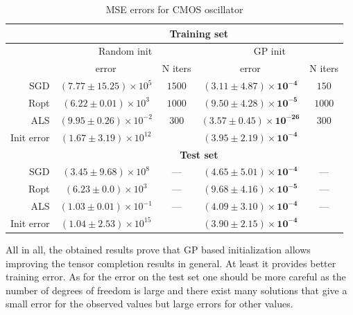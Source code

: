 \begin{table}[]
    \centering
    \caption{MSE errors for CMOS oscillator}
    \label{tab:results_cmos}
    \begin{tabular}{r|cc|cc|}
         & \multicolumn{4}{c|}{\textbf{Training set}} \\
        \hline
        & \multicolumn{2}{c|}{Random init} & \multicolumn{2}{c|}{GP init} \\
        & error & N iters & error & N iters \\
        \hline
        SGD & $(7.77 \pm 15.25) \times 10^5$ & $1500$ &
        $\mathbf{(3.11 \pm 4.87) \times 10^{-4}}$ & $150$ \\

        Ropt & $(6.22 \pm 0.01) \times 10^3$ & $1000$ &
        $\mathbf{(9.50 \pm 4.28) \times 10^{-5}}$ & $1000$ \\

        ALS & $(9.95 \pm 0.26) \times 10^{-2}$ & $300$ &
        $\mathbf{(3.57 \pm 0.45) \times 10^{-26}}$ & $300$ \\
        \hline
        Init error & $(1.67 \pm 3.19) \times 10^{12}$ & &
        $\mathbf{(3.95 \pm 2.19) \times 10^{-4}}$ & \\
        \hline

         & \multicolumn{4}{c|}{\textbf{Test set}} \\
        \hline

        SGD & $(3.45 \pm 9.68) \times 10^8$ & --- &
        $\mathbf{(4.65 \pm 5.01) \times 10^{-4}}$ & --- \\

        Ropt & $(6.23 \pm 0.0) \times 10^3$ & --- &
        $\mathbf{(9.68 \pm 4.16) \times 10^{-5}}$ & --- \\

        ALS & $(1.03 \pm 0.01) \times 10^{-1}$ & --- &
        $\mathbf{(4.09 \pm 3.10) \times 10^{-4}}$ & --- \\
        \hline
        Init error & $(1.04 \pm 2.53) \times 10^{15}$ & &
        $\mathbf{(3.90 \pm 2.15) \times 10^{-4}}$ & \\
        \hline
    \end{tabular}
\end{table}



All in all, the obtained results prove that GP based initialization allows improving the tensor completion results in general. At least it provides better training error. As for the error on the test set one should be more careful as the number of degrees of freedom is large and there exist many solutions that give a small error for the observed values but large errors for other values.



